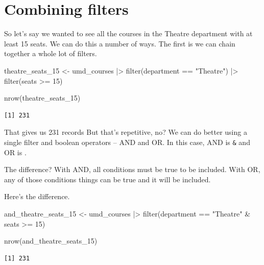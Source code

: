 \documentclass[
  letterpaper,
  DIV=11,
  numbers=noendperiod]{scrreprt}
\newenvironment{Shaded}{\begin{snugshade}}{\end{snugshade}}
\newcommand{\DecValTok}[1]{\textcolor[rgb]{0.68,0.00,0.00}{#1}}
\newcommand{\FunctionTok}[1]{\textcolor[rgb]{0.28,0.35,0.67}{#1}}
\newcommand{\NormalTok}[1]{\textcolor[rgb]{0.00,0.23,0.31}{#1}}
\newcommand{\OtherTok}[1]{\textcolor[rgb]{0.00,0.23,0.31}{#1}}
\newcommand{\SpecialCharTok}[1]{\textcolor[rgb]{0.37,0.37,0.37}{#1}}
\newcommand{\StringTok}[1]{\textcolor[rgb]{0.13,0.47,0.30}{#1}}
\begin{document}
\hypertarget{combining-filters}{%
\section{Combining filters}\label{combining-filters}}

So let's say we wanted to see all the courses in the Theatre department
with at least 15 seats. We can do this a number of ways. The first is we
can chain together a whole lot of filters.

\begin{Shaded}
\begin{Highlighting}[]
\NormalTok{theatre\_seats\_15 }\OtherTok{\textless{}{-}}\NormalTok{ umd\_courses }\SpecialCharTok{|\textgreater{}} \FunctionTok{filter}\NormalTok{(department }\SpecialCharTok{==} \StringTok{"Theatre"}\NormalTok{) }\SpecialCharTok{|\textgreater{}} \FunctionTok{filter}\NormalTok{(seats }\SpecialCharTok{\textgreater{}=} \DecValTok{15}\NormalTok{)}

\FunctionTok{nrow}\NormalTok{(theatre\_seats\_15)}
\end{Highlighting}
\end{Shaded}

\begin{verbatim}
[1] 231
\end{verbatim}

That gives us 231 records But that's repetitive, no? We can do better
using a single filter and boolean operators -- AND and OR. In this case,
AND is \texttt{\&} and OR is \texttt{\textbar{}}.

The difference? With AND, all conditions must be true to be included.
With OR, any of those conditions things can be true and it will be
included.

Here's the difference.

\begin{Shaded}
\begin{Highlighting}[]
\NormalTok{and\_theatre\_seats\_15 }\OtherTok{\textless{}{-}}\NormalTok{ umd\_courses }\SpecialCharTok{|\textgreater{}} \FunctionTok{filter}\NormalTok{(department }\SpecialCharTok{==} \StringTok{"Theatre"} \SpecialCharTok{\&}\NormalTok{ seats }\SpecialCharTok{\textgreater{}=} \DecValTok{15}\NormalTok{)}

\FunctionTok{nrow}\NormalTok{(and\_theatre\_seats\_15)}
\end{Highlighting}
\end{Shaded}

\begin{verbatim}
[1] 231
\end{verbatim}
\end{document}

